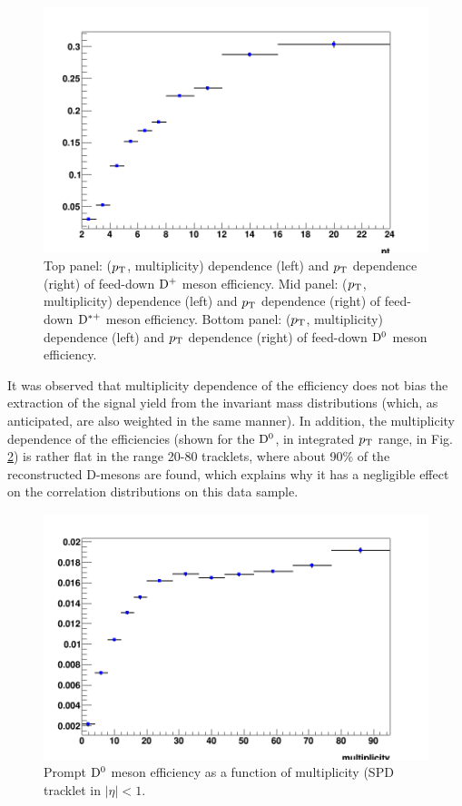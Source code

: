 \begin{figure}[h]
	\includegraphics[width=.48\linewidth]{figures/Effs/EfficiencyMap_1D_Dzero_b_Ref_wLimAcc_Plot.png}
	\caption{Top panel: ($p_{\rm T}$, multiplicity) dependence (left) and $p_{\rm T}$ dependence (right) of feed-down ${\rm D^+}$ meson efficiency.
Mid panel: ($p_{\rm T}$, multiplicity) dependence (left) and $p_{\rm T}$ dependence (right) of feed-down ${\rm D^{*+}}$ meson efficiency.
Bottom panel: ($p_{\rm T}$, multiplicity) dependence (left) and $p_{\rm T}$ dependence (right) of feed-down ${\rm D^0}$ meson efficiency.}
	\label{fig:dEffFD}	
\end{figure}
\clearpage

It was observed that multiplicity dependence of the efficiency does not bias the extraction of the signal yield from the invariant mass distributions (which, as anticipated, are also weighted in the same manner). In addition, the multiplicity dependence of the efficiencies (shown for the ${\rm D^0}$, in integrated $p_{\rm T}$ range, in Fig. \ref{fig:DeffY}) is rather flat in the range 20-80 tracklets, where about 90\% of the reconstructed D-mesons are found, which explains why it has a negligible effect on the correlation distributions on this data sample.
\begin{figure}[h]   %
	\centering
	\includegraphics[width=.48\linewidth]{figures/Effs/EfficiencyMap_1D_Dzero_c_RefPtBins_Ydep_wLimAcc_Plot.png}
\caption{Prompt ${\rm D^0}$ meson efficiency as a function of multiplicity (SPD tracklet in $|\eta|<1$.}
	\label{fig:DeffY}	
\end{figure}
\clearpage 